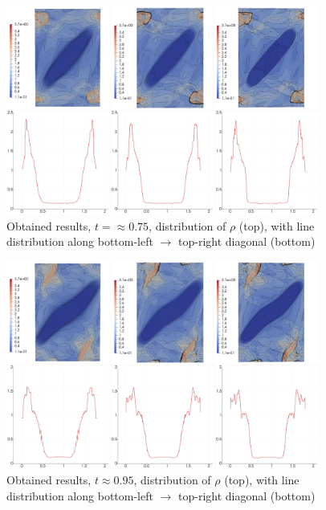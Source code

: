 \begin{figure}[H]
	\begin{center}
		\includegraphics[width=0.92\textwidth]{img/mhd-blast/new/blast,1noadapt14.jpg}
\vspace{-3mm}
	\caption{Obtained results, $t = \approx 0.75$, distribution of $\rho$ (top), with line distribution along bottom-left $\rightarrow$ top-right diagonal (bottom)}
	\label{figure:blastNew15}
	\end{center}
\end{figure}
\vspace{-10mm}

\begin{figure}[H]
	\begin{center}
		\includegraphics[width=0.92\textwidth]{img/mhd-blast/new/blast,1noadapt18.jpg}
\vspace{-3mm}
	\caption{Obtained results, $t \approx 0.95$, distribution of $\rho$ (top), with line distribution along bottom-left $\rightarrow$ top-right diagonal (bottom)}
	\label{figure:blastNew16}
	\end{center}
\end{figure}
\vspace{-6mm}

